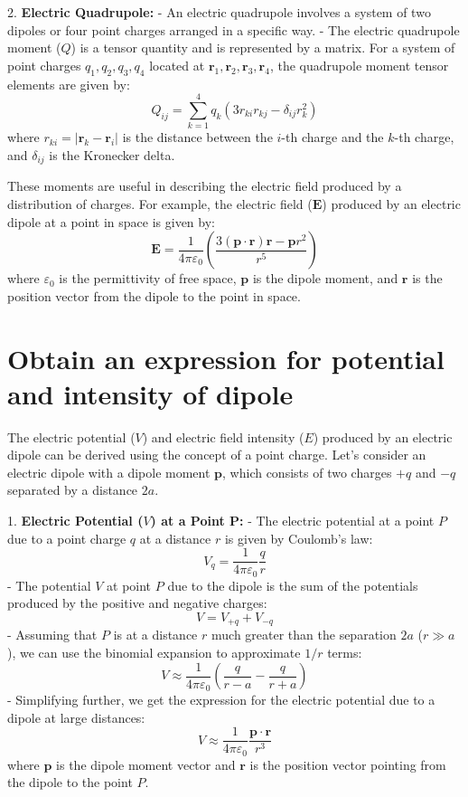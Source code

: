 \documentclass[a4paper, 12pt]{article}
\begin{document}
2. {\bf Electric Quadrupole:}
   - An electric quadrupole involves a system of two dipoles or four point charges arranged in a specific way.
   - The electric quadrupole moment (\(Q\)) is a tensor quantity and is represented by a matrix. For a system of point charges \(q_1, q_2, q_3, q_4\) located at \(\mathbf{r}_1, \mathbf{r}_2, \mathbf{r}_3, \mathbf{r}_4\), the quadrupole moment tensor elements are given by:
     \[ Q_{ij} = \sum_{k=1}^4 q_k (3r_{ki} r_{kj} - \delta_{ij} r_k^2) \]
     where \(r_{ki} = |\mathbf{r}_k - \mathbf{r}_i|\) is the distance between the \(i\)-th charge and the \(k\)-th charge, and \(\delta_{ij}\) is the Kronecker delta.

These moments are useful in describing the electric field produced by a distribution of charges. For example, the electric field (\(\mathbf{E}\)) produced by an electric dipole at a point in space is given by:
\[ \mathbf{E} = \frac{1}{4\pi \varepsilon_0} \left( \frac{3(\mathbf{p} \cdot \mathbf{r}) \mathbf{r} - \mathbf{p}r^2}{r^5} \right) \]
where \(\varepsilon_0\) is the permittivity of free space, \(\mathbf{p}\) is the dipole moment, and \(\mathbf{r}\) is the position vector from the dipole to the point in space.

\section*{Obtain an expression for potential and intensity of dipole}

The electric potential (\(V\)) and electric field intensity (\(E\)) produced by an electric dipole can be derived using the concept of a point charge. Let's consider an electric dipole with a dipole moment \(\mathbf{p}\), which consists of two charges \(+q\) and \(-q\) separated by a distance \(2a\).

1. {\bf Electric Potential (\(V\)) at a Point P:}
   - The electric potential at a point \(P\) due to a point charge \(q\) at a distance \(r\) is given by Coulomb's law:
     \[ V_q = \frac{1}{4\pi\varepsilon_0} \frac{q}{r} \]
   - The potential \(V\) at point \(P\) due to the dipole is the sum of the potentials produced by the positive and negative charges:
     \[ V = V_{+q} + V_{-q} \]
   - Assuming that \(P\) is at a distance \(r\) much greater than the separation \(2a\) (\(r \gg a\)), we can use the binomial expansion to approximate \(1/r\) terms:
     \[ V \approx \frac{1}{4\pi\varepsilon_0} \left( \frac{q}{r - a} - \frac{q}{r + a} \right) \]
   - Simplifying further, we get the expression for the electric potential due to a dipole at large distances:
     \[ V \approx \frac{1}{4\pi\varepsilon_0} \frac{\mathbf{p} \cdot \mathbf{r}}{r^3} \]
     where \(\mathbf{p}\) is the dipole moment vector and \(\mathbf{r}\) is the position vector pointing from the dipole to the point \(P\).
\end{document}
